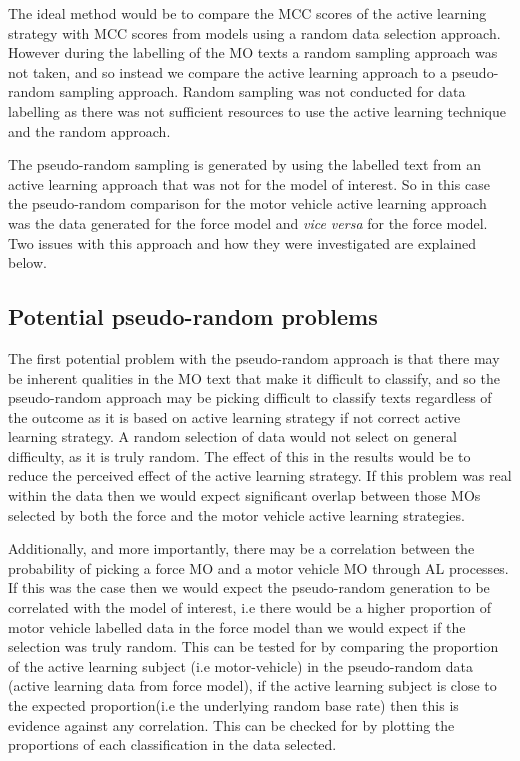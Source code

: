 The ideal method would be to compare the MCC scores of the active learning strategy with MCC scores from models using a random data selection approach. However during the labelling of the MO texts a random sampling approach was not taken, and so instead we compare the active learning approach to a pseudo-random sampling approach. Random sampling was not conducted for data labelling as there was not sufficient resources to use the active learning technique and the random approach.

The pseudo-random sampling is generated by using the labelled text from an active learning approach that was not for the model of interest. So in this case the pseudo-random comparison for the motor vehicle active learning approach was the data generated for the force model and \emph{vice versa} for the force model. Two issues with this approach and how they were investigated are explained below.

\subsection{Potential pseudo-random problems}
The first potential problem with the pseudo-random approach is that there may be inherent qualities in the MO text that make it difficult to classify, and so the pseudo-random approach may be picking difficult to classify texts regardless of the outcome as it is based on  active learning strategy if not  correct active learning strategy. A random selection of data would not select on general difficulty, as it is truly random. The effect of this in the results would be to reduce the perceived effect of the active learning strategy. If this problem was real within the data then we would expect significant overlap between those MOs selected by both the force and the motor vehicle active learning strategies. 

Additionally, and more importantly, there may be a correlation between the probability of picking a force MO and a motor vehicle MO through AL processes. If this was the case then we would expect the pseudo-random generation to be correlated with the model of interest, i.e there would be a higher proportion of motor vehicle labelled data in the force model than we would expect if the selection was truly random. This can be tested for by comparing the proportion of the active learning subject (i.e motor-vehicle) in the pseudo-random data (active learning data from force model), if the active learning subject is close to the expected proportion(i.e the underlying random base rate) then this is evidence against any correlation. This can be checked for by plotting the proportions of each classification in the data selected.  

